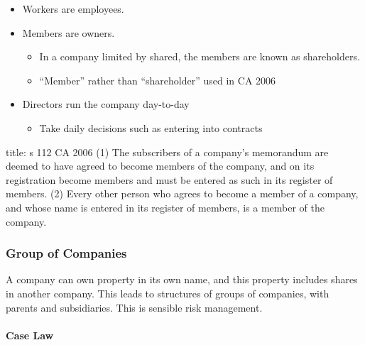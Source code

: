 \documentclass[
]{article}
\newenvironment{Shaded}{}{}
\newcommand{\NormalTok}[1]{#1}
\providecommand{\tightlist}{%
  \setlength{\itemsep}{0pt}\setlength{\parskip}{0pt}}
\begin{document}
\begin{itemize}
\tightlist
\item
  Workers are employees.
\item
  Members are owners.

  \begin{itemize}
  \tightlist
  \item
    In a company limited by shared, the members are known as
    shareholders.
  \item
    ``Member'' rather than ``shareholder'' used in CA 2006
  \end{itemize}
\item
  Directors run the company day-to-day

  \begin{itemize}
  \tightlist
  \item
    Take daily decisions such as entering into contracts
  \end{itemize}
\end{itemize}

\begin{Shaded}
\begin{Highlighting}[]
\NormalTok{title: s 112 CA 2006}
\NormalTok{(1) The subscribers of a company’s memorandum are deemed to have  }
\NormalTok{agreed to become members of the company, and on its registration  }
\NormalTok{become members and must be entered as such in its register of  }
\NormalTok{members.  }
\NormalTok{(2) Every other person who agrees to become a member of a company,  }
\NormalTok{and whose name is entered in its register of members, is a member of  }
\NormalTok{the company.}
\end{Highlighting}
\end{Shaded}

\hypertarget{group-of-companies}{%
\subsubsection{Group of Companies}\label{group-of-companies}}

A company can own property in its own name, and this property includes
shares in another company. This leads to structures of groups of
companies, with parents and subsidiaries. This is sensible risk
management.

\hypertarget{case-law}{%
\paragraph{Case Law}\label{case-law}}
\end{document}
